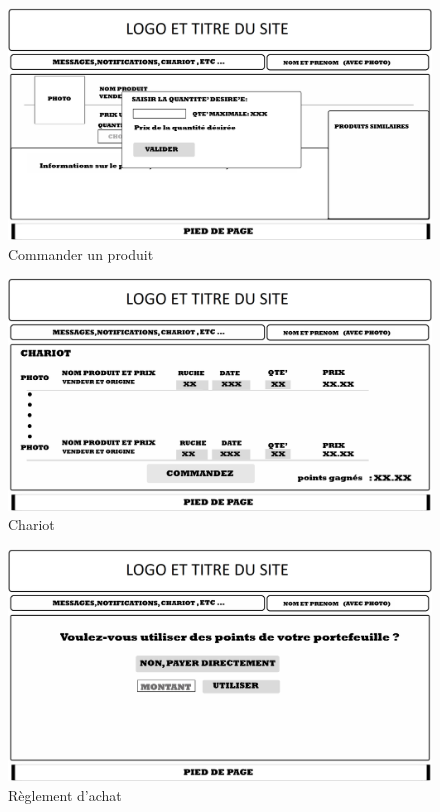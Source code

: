 \documentclass[a4paper,12pt]{report}
\theoremstyle{break}
\theoremstyle{break}
\theoremstyle{break}
\theoremstyle{break}
\theoremstyle{definition}
\theoremstyle{remark}
\begin{document}
\begin{appendices}
\begin{figure}[!ht]
  \centering
  \includegraphics[scale=0.25]{images/storyboard/04_1.jpg}
  \caption{Commander un produit}
\end{figure}

\begin{figure}[!ht]
  \centering
  \includegraphics[scale=0.25]{images/storyboard/04_2.jpg}
  \caption{Chariot}
\end{figure}

\begin{figure}[!ht]
  \centering
  \includegraphics[scale=0.25]{images/storyboard/04_3.jpg}
  \caption{Règlement d'achat}
\end{figure}


\end{appendices}
\end{document}
